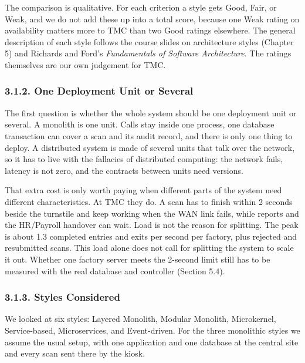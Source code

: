 The comparison is qualitative. For each criterion a style gets Good, Fair, or Weak, and we do not add these up into a total score, because one Weak rating on availability matters more to TMC than two Good ratings elsewhere. The general description of each style follows the course slides on architecture styles (Chapter 5) and Richards and Ford's \textit{Fundamentals of Software Architecture}. The ratings themselves are our own judgement for TMC.

\subsubsection*{3.1.2. One Deployment Unit or Several}

{}


The first question is whether the whole system should be one deployment unit or several. A monolith is one unit. Calls stay inside one process, one database transaction can cover a scan and its audit record, and there is only one thing to deploy. A distributed system is made of several units that talk over the network, so it has to live with the fallacies of distributed computing: the network fails, latency is not zero, and the contracts between units need versions.

That extra cost is only worth paying when different parts of the system need different characteristics. At TMC they do. A scan has to finish within 2 seconds beside the turnstile and keep working when the WAN link fails, while reports and the HR/Payroll handover can wait. Load is not the reason for splitting. The peak is about 1.3 completed entries and exits per second per factory, plus rejected and resubmitted scans. This load alone does not call for splitting the system to scale it out. Whether one factory server meets the 2-second limit still has to be measured with the real database and controller (Section 5.4).

\subsubsection*{3.1.3. Styles Considered}

{}


We looked at six styles: Layered Monolith, Modular Monolith, Microkernel, Service-based, Microservices, and Event-driven. For the three monolithic styles we assume the usual setup, with one application and one database at the central site and every scan sent there by the kiosk.

